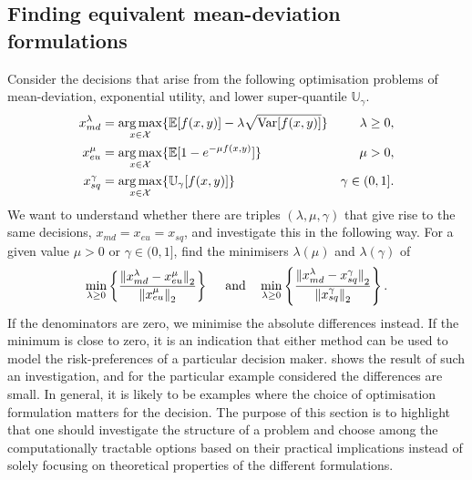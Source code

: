 \documentclass[main.tex]{subfiles}
\begin{document}
\subsection{Finding equivalent mean-deviation formulations}
Consider the decisions that arise from the following
optimisation problems of mean-deviation, exponential utility, and
lower super-quantile $\mathbb{U}_\gamma$.
\begin{subequations}\label{eq:optim_formulations}
  \begin{align}\label{eq:optim_formulations_md}
    x_{md}^\lambda
    &=\operatorname*{arg\,max}_{x\in\mathcal{X}}\{\mathbb{E}[f(x,y)]-\lambda\sqrt{\mbox{Var}[f(x,y)]}\}
    &\lambda\geq 0,\\\label{eq:optim_formulations_eu}
    x_{eu}^\mu
    &=\operatorname*{arg\,max}_{x\in\mathcal{X}}\{
      \mathbb{E}[1-e^{-\mu f(x,y)}]\}
    &\mu>0,\\\label{eq:optim_formulations_sq}
    x_{sq}^\gamma
    &=\operatorname*{arg\,max}_{x\in\mathcal{X}}
      \{\mathbb{U}_\gamma[f(x,y)]\}
    &\gamma\in(0,1].
  \end{align}
\end{subequations}
We want to understand whether there are triples $(\lambda,\mu,\gamma)$ that give rise
to the same decisions, $x_{md}=x_{eu}=x_{sq}$, and investigate this in
the following way.
For a given value $\mu>0$ or $\gamma\in(0,1]$, find the minimisers
$\lambda(\mu)$ and $\lambda(\gamma)$ of
\begin{equation}\label{eq:min_xmd_xeu_xsq}
  \min_{\lambda\geq 0}\left\{\frac{{\|x_{md}^\lambda-x_{eu}^\mu\|}_2}{{{\|x_{eu}^\mu}\|}_2}\right\}\quad
  \textnormal{ and}\quad
  \min_{\lambda\geq 0}\left\{\frac{{\|x_{md}^\lambda-x_{sq}^\gamma\|}_2}{{{\|x_{sq}^\gamma}\|}_2}\right\}.
\end{equation}
If the denominators are zero, we minimise the absolute differences instead.
If the minimum is close to zero, it is an indication that either method
can be used to model the risk-preferences of a particular decision maker.
 shows the result of such an investigation,
and for the particular example considered the differences are small.
In general, it is likely to be examples where the choice of
optimisation formulation matters for the decision. The purpose of this
section is to highlight that one should investigate the structure of
a problem and choose among the computationally tractable options based
on their practical implications instead of solely focusing on
theoretical properties of the different formulations.
\end{document}
